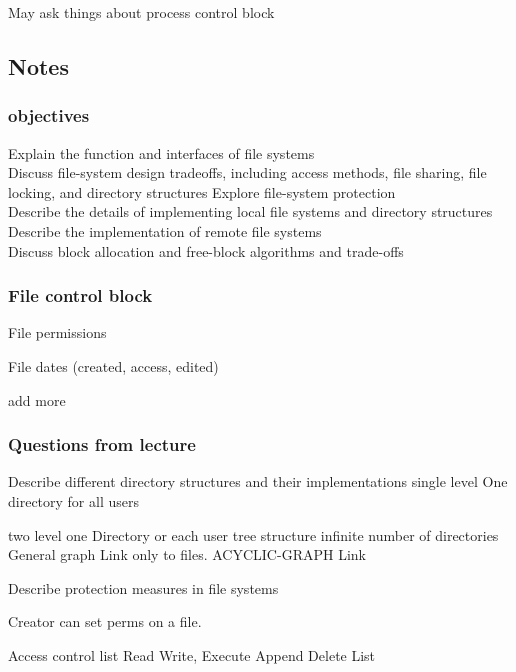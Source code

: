 \documentclass[a4paper,10pt,titlepage]{report}
\begin{document}
May ask things about process control block


\subsection{Notes}
\subsubsection{objectives}

Explain the function and interfaces of file systems\\

Discuss file-system design tradeoffs, including access
methods, file sharing, file locking, and directory structures
Explore file-system protection \\

Describe the details of implementing local file systems
and directory structures\\


Describe the implementation of remote file systems \\

Discuss block allocation and free-block algorithms and
trade-offs
\\



\subsubsection{File control block}
File permissions

File dates (created, access, edited)

add more



\subsubsection{Questions from lecture}

Describe different directory structures and their implementations 
	single level
		One directory for all users
		
	two level
		one Directory or each user
	tree structure
		infinite number of directories
	General graph
		Link only to files.
	ACYCLIC-GRAPH
		Link

Describe protection measures in file systems

	Creator can set perms on a file.	
	
	Access control list
		Read
		Write,
		Execute
		Append
		Delete
		List
		
\end{document}
